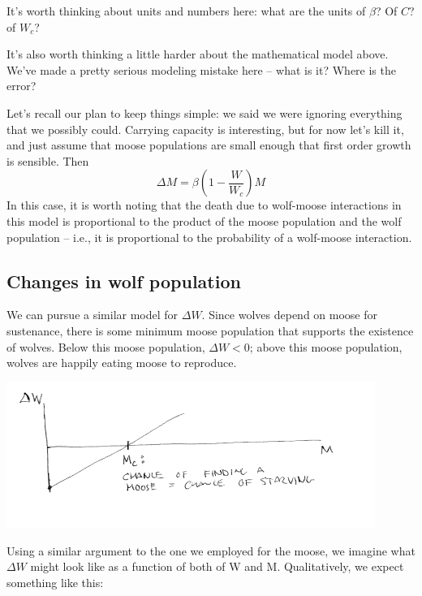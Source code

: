 \begin{del}
 It's worth thinking about units and numbers here:  what are the units of $\beta$?  Of $C$?  of $W_c$?
\end{del}

\begin{del}
It's also worth thinking a little harder about the mathematical model above.  We've made a pretty serious modeling mistake here -- what is it?  Where is the error?
\end{del}

Let's recall our plan to keep things simple:  we said we were ignoring everything that we possibly could.  Carrying capacity is interesting, but for now let's kill it, and just assume that moose populations are small enough that first order growth is sensible.  Then
$$\Delta M = \beta(1-\frac{W}{W_c})M$$
In this case, it is worth noting that the death due to wolf-moose interactions in this model is proportional to the product of the moose population and the wolf population -- i.e., it is proportional to the probability of  a wolf-moose interaction.  

\subsection{Changes in wolf population}
We can pursue a similar model for $\Delta W$.  Since wolves depend on moose for sustenance, there is some minimum moose population that supports the existence of wolves.  Below this moose population, $\Delta W <0$; above this moose population, wolves are happily eating moose to reproduce. 


\includegraphics[width=12cm]{figs/DeltaWvsM}


Using a similar argument to the one we employed for the moose, we imagine what $\Delta W$ might look like as a function of both of W and M. Qualitatively, we expect something like this:


